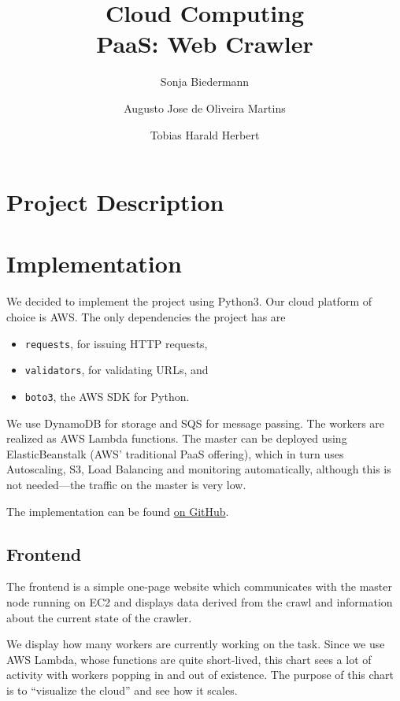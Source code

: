 \documentclass[english]{scrartcl}
\begin{document}
\title{Cloud Computing\\PaaS: Web Crawler}

\author{Sonja Biedermann \and Augusto Jose de Oliveira Martins \and Tobias Harald Herbert}

\maketitle
\tableofcontents

\section{Project Description}

\section{Implementation}

We decided to implement the project using Python3. Our cloud platform of choice
is AWS. The only dependencies the project has are

\begin{itemize}
    \item \texttt{requests}, for issuing HTTP requests,
    \item \texttt{validators}, for validating URLs, and
    \item \texttt{boto3}, the AWS SDK for Python.
\end{itemize}

We use DynamoDB for storage and SQS for message passing. The workers are realized
as AWS Lambda functions. The master can be deployed using ElasticBeanstalk (AWS'
traditional PaaS offering), which in turn uses Autoscaling, S3, Load Balancing
and monitoring automatically, although this is not needed---the traffic on the
master is very low.

The implementation can be found \href{https://github.com/biederfrau/cloud-computing-paas}{on GitHub}.

\subsection{Frontend}

The frontend is a simple one-page website which communicates with the
master node running on EC2 and displays data derived from the crawl and
information about the current state of the crawler.

We display how many workers are currently working on the task. Since we use AWS
Lambda, whose functions are quite short-lived, this chart sees a lot of
activity with workers popping in and out of existence. The purpose of this
chart is to ``visualize the cloud'' and see how it scales.
\end{document}
